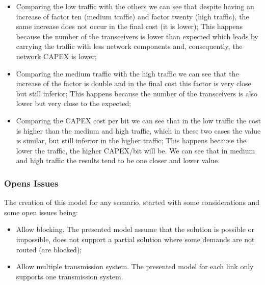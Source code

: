 \begin{itemize}
  \item Comparing the low traffic with the others we can see that despite having an increase of factor ten (medium traffic) and factor twenty (high traffic), the same increase does not occur in the final cost (it is lower);
  \subitem This happens because the number of the transceivers is lower than expected which leads by carrying the traffic with less network components and, consequently, the network CAPEX is lower;
  \item Comparing the medium traffic with the high traffic we can see that the increase of the factor is double and in the final cost this factor is very close but still inferior;
  \subitem This happens because the number of the transceivers is also lower but very close to the expected;
  \item Comparing the CAPEX cost per bit we can see that in the low traffic the cost is higher than the medium and high traffic, which in these two cases the value is similar, but still inferior in the higher traffic;
  \subitem This happens because the lower the traffic, the higher CAPEX/bit will be. We can see that in medium and high traffic the results tend to be one closer and lower value.
\end{itemize}

\vspace{13pt}
\subsubsection{Opens Issues}

The creation of this model for any scenario, started with some considerations and some open issues being:

\begin{itemize}
  \item Allow blocking.
  \subitem The presented model assume that the solution is possible or impossible, does not support a partial solution where some demands are not routed (are blocked);
  \item Allow multiple transmission system.
  \subitem The presented model for each link only supports one transmission system.
\end{itemize}
